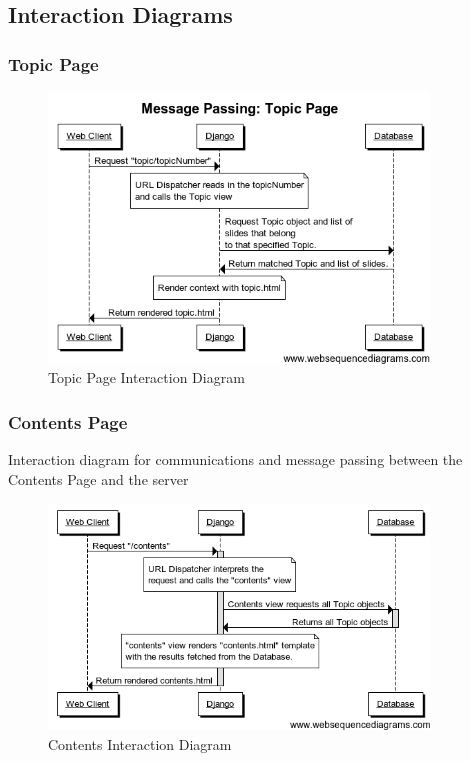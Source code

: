 \documentclass{l3proj}
\begin{document}
{\subsection{Interaction Diagrams}
\subsubsection{Topic Page}
\begin{figure}[!htb]
\caption{Topic Page Interaction Diagram}
 \centering
\includegraphics[width=0.9\textwidth]{images/topicPageMessagePassing.png}
\end{figure}

\subsubsection{Contents Page}
Interaction diagram for communications and message passing between the Contents Page and the server
\begin{figure}[!htb]
\caption{Contents Interaction Diagram}
 \centering
\includegraphics[width=0.9\textwidth]{images/contentsInteractionDiagram.png}
\end{figure}
}
\end{document}
